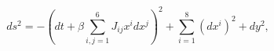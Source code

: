 \begin{equation}
\label{metn3iib}
ds^2 = - \left( dt + \beta \sum_{i,j=1}^6 J_{ij} x^i dx^j \right)^2  
+ \sum_{i=1}^8 ( dx^i )^2  + dy^2,
\end{equation}

